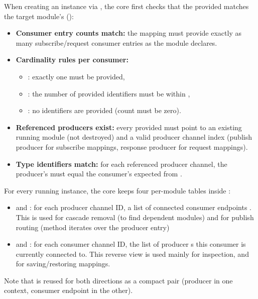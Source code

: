 When creating an instance via , the core first checks that the provided  matches the target module's  ():
\begin{itemize}
    \item \textbf{Consumer entry counts match:} the mapping must provide exactly as many subscribe/request consumer entries as the module declares.
    \item \textbf{Cardinality rules per consumer:}
    \begin{itemize}
        \item {}: exactly one  must be provided,
        \item {}: the number of provided identifiers must be within ,
        \item {}: no identifiers are provided (count must be zero).
    \end{itemize}
    \item \textbf{Referenced producers exist:} every provided  must point to an existing running module (not destroyed) and a valid producer channel index (publish producer for subscribe mappings, response producer for request mappings).
    \item \textbf{Type identifiers match:} for each referenced producer channel, the producer's  must equal the consumer's expected  from .
\end{itemize}

For every running instance, the core keeps four per-module tables inside :
\begin{itemize}
    \item {} and :
    for each producer channel ID, a list of connected consumer endpoints . This is used for cascade removal (to find dependent modules) and for publish routing (method  iterates over the producer  entry)
    \item {} and :
    for each consumer channel ID, the list of producer s this consumer is currently connected to.
    This reverse view is used mainly for inspection, and for saving/restoring mappings.
\end{itemize}
Note that  is reused for both directions as a compact  pair (producer in one context, consumer endpoint in the other).

